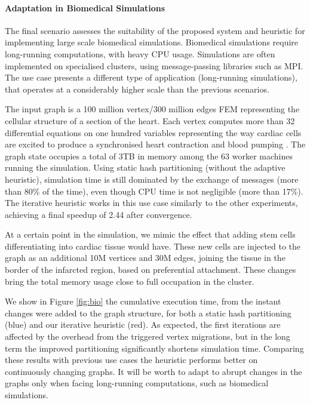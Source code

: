 \documentclass{sig-alternate-10pt}
\begin{document}
 
\paragraph{\textbf{Adaptation in Biomedical Simulations}}

The final scenario assesses the suitability of the proposed system and heuristic for implementing large scale biomedical simulations. Biomedical simulations require long-running computations, with heavy CPU usage. Simulations are often implemented on specialised clusters, using message-passing libraries such as MPI. The use case presents a different type of application (long-running simulations), that operates at a considerably higher scale than the previous scenarios.

The input graph is a 100 million vertex/300 million edges FEM representing the cellular structure of a section of the heart. Each vertex computes more than 32 differential equations on one hundred variables representing the way cardiac cells are excited to produce a synchronised heart contraction and blood pumping \cite{Tusscher2004}. The graph state occupies a total of 3TB in memory among the 63 worker machines running the simulation. Using static hash partitioning (without the adaptive heuristic), simulation time is still dominated by the exchange of messages (more than 80\% of the time), even though CPU time is not negligible (more than 17\%).  The iterative heuristic works in this use case similarly to the other experiments, achieving a final speedup of 2.44 after convergence.

At a certain point in the simulation, we mimic the effect that adding stem cells differentiating into cardiac tissue would have. These new cells are injected to the graph as an additional 10M vertices and 30M edges, joining the tissue in the border of the infarcted region, based on preferential attachment. These changes bring the total memory usage close to full occupation in the cluster. 

We show in Figure \ref{fig:bio} the cumulative execution time, from the instant changes were added to the graph structure, for both a static hash partitioning (blue) and our iterative heuristic (red). As expected, the first iterations are affected by the overhead from the triggered vertex migrations, but in the long term the improved partitioning significantly shortens simulation time. Comparing these results with previous use cases the heuristic performs better on continuously changing graphs. It will be worth to adapt to abrupt changes in the graphs only when facing long-running computations, such as biomedical simulations.
\end{document}
